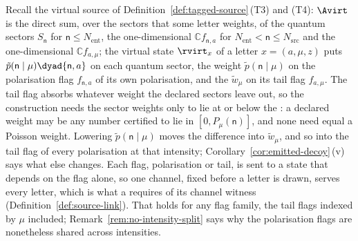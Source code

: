 
Recall the virtual source of Definition~\ref{def:tagged-source}\,(T3) and
(T4): $\Avirt$ is the direct sum, over the sectors that some letter weights, of
the quantum sectors $S_{\mathsf{n}}$ for $\mathsf{n}\le N_{\mathrm{ent}}$, the
one-dimensional 
$\mathbb{C}f_{\mathsf{n},a}$ for $N_{\mathrm{ent}}<\mathsf{n}\le N_{\mathrm{src}}$
and the one-dimensional  $\mathbb{C}f_{a,\mu}$; the
virtual state $\rvirt_x$ of a letter $x=(a,\mu,z)$ puts
$\tilde p(\mathsf{n}\mid\mu)\dyad{\mathsf{n},a}$ on each quantum sector, the
weight $\tilde p(\mathsf{n}\mid\mu)$ on the polarisation flag $f_{\mathsf{n},a}$
of its own polarisation, and the  $\tilde w_\mu$ on its tail
flag $f_{a,\mu}$. The tail flag absorbs whatever weight the declared sectors
leave out, so the construction needs the sector weights only to lie at or below
the : a declared weight may be any number
certified to lie in $[0,P_\mu(\mathsf{n})]$, and none need equal a Poisson
weight. Lowering $\tilde p(\mathsf{n}\mid\mu)$ moves the
difference into $\tilde w_\mu$, and so into the tail flag of every polarisation
at that intensity; Corollary~\ref{cor:emitted-decoy}\,(v) says what else
changes. Each flag, polarisation or tail, is sent to a state that depends on
the flag alone, so one channel, fixed before a letter is drawn, serves every
letter, which is what a  requires of its channel witness
(Definition~\ref{def:source-link}). That holds for any flag family, the tail
flags indexed by $\mu$ included; Remark~\ref{rem:no-intensity-split} says why
the polarisation flags are nonetheless shared across intensities.

